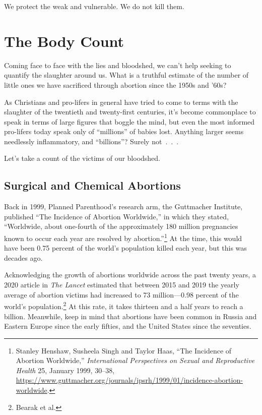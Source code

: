 \documentclass[
]{book}
\begin{document}
We protect the weak and vulnerable. We do not kill them.

\hypertarget{the-body-count}{%
\section{The Body Count}\label{the-body-count}}

Coming face to face with the lies and bloodshed, we can't help seeking to quantify the slaughter around us. What is a truthful estimate of the number of little ones we have sacrificed through abortion since the 1950s and '60s?

As Christians and pro-lifers in general have tried to come to terms with the slaughter of the twentieth and twenty-first centuries, it's become commonplace to speak in terms of large figures that boggle the mind, but even the most informed pro-lifers today speak only of ``millions'' of babies lost. Anything larger seems needlessly inflammatory, and ``billions''? Surely not~.~.~.

Let's take a count of the victims of our bloodshed.

\hypertarget{surgical-and-chemical-abortions}{%
\subsection{Surgical and Chemical Abortions}\label{surgical-and-chemical-abortions}}

Back in 1999, Planned Parenthood's research arm, the Guttmacher Institute, published ``The Incidence of Abortion Worldwide,'' in which they stated, ``Worldwide, about one-fourth of the approximately 180 million pregnancies known to occur each year are resolved by abortion.''\footnote{Stanley Henshaw, Susheela Singh and Taylor Haas, ``The Incidence of Abortion Worldwide,'' \emph{International Perspectives on Sexual and Reproductive Health} 25, January 1999, 30--38, \url{https://www.guttmacher.org/journals/ipsrh/1999/01/incidence-abortion-worldwide}.} At the time, this would have been 0.75 percent of the world's population killed each year, but this was decades ago.

Acknowledging the growth of abortions worldwide across the past twenty years, a 2020 article in \emph{The Lancet} estimated that between 2015 and 2019 the yearly average of abortion victims had increased to 73 million---0.98 percent of the world's population.\footnote{Bearak et al.} At this rate, it takes thirteen and a half years to reach a billion. Meanwhile, keep in mind that abortions have been common in Russia and Eastern Europe since the early fifties, and the United States since the seventies.
\end{document}
